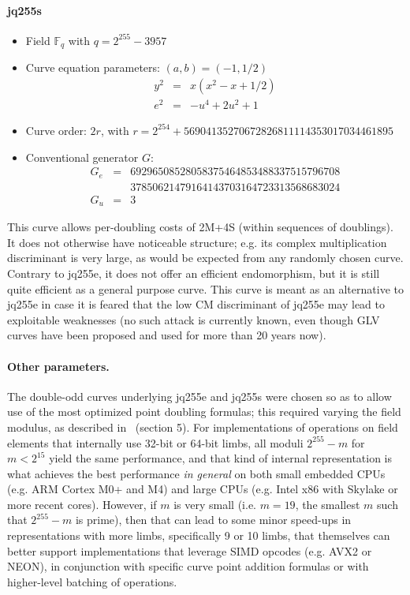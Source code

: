 \documentclass{llncs}
\newcommand{\bF}{\mathbb{F}}
\begin{document}
\paragraph{jq255s}
\begin{itemize}

    \item Field $\bF_q$ with $q = 2^{255} - 3957$

    \item Curve equation parameters: $(a, b) = (-1, 1/2)$
    \begin{eqnarray*}
        y^2 &=& x(x^2 - x + 1/2) \\
        e^2 &=& -u^4 + 2u^2 + 1
    \end{eqnarray*}

    \item Curve order: $2r$, with $r = 2^{254} + 56904135270672826811114353017034461895$

    \item Conventional generator $G$:
    \begin{eqnarray*}
        G_e &=& 69296508528058375464853488337515796708 \\
            & & 37850621479164143703164723313568683024 \\
        G_u &=& 3
    \end{eqnarray*}

\end{itemize}

This curve allows per-doubling costs of 2M+4S (within sequences of
doublings). It does not otherwise have noticeable structure; e.g. its
complex multiplication discriminant is very large, as would be expected
from any randomly chosen curve. Contrary to jq255e, it does not offer an
efficient endomorphism, but it is still quite efficient as a general
purpose curve. This curve is meant as an alternative to jq255e in case
it is feared that the low CM discriminant of jq255e may lead to
exploitable weaknesses (no such attack is currently known, even though
GLV curves have been proposed and used for more than 20 years now).

\paragraph{Other parameters.}
The double-odd curves underlying jq255e and jq255s were chosen so as to
allow use of the most optimized point doubling formulas; this required
varying the field modulus, as described in~\cite{Por2020-5} (section 5).
For implementations of operations on field elements that internally use
32-bit or 64-bit limbs, all moduli $2^{255}-m$ for $m < 2^{15}$ yield
the same performance, and that kind of internal representation is what
achieves the best performance \emph{in general} on both small embedded
CPUs (e.g. ARM Cortex M0+ and M4) and large CPUs (e.g. Intel x86 with
Skylake or more recent cores). However, if $m$ is very small (i.e.
$m = 19$, the smallest $m$ such that $2^{255}-m$ is prime), then that
can lead to some minor speed-ups in representations with more limbs,
specifically 9 or 10 limbs, that themselves can better support
implementations that leverage SIMD opcodes (e.g. AVX2 or NEON), in
conjunction with specific curve point addition formulas or with
higher-level batching of operations.
\end{document}
